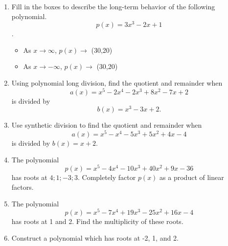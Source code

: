 \documentclass{article}
\begin{document}
\ActivityTitle[class={College Algebra}, number={3}, name={Polynomials 1}]

\begin{enumerate}
\item Fill in the boxes to describe the long-term behavior of the following polynomial. \[ p(x) = 3x^3 - 2x + 1 \].

\begin{itemize}
\item As $x \rightarrow \infty$, $p(x) \rightarrow$ \framebox(30,20){} \vspace{0.5cm}
\item As $x \rightarrow -\infty$, $p(x) \rightarrow$ \framebox(30,20){}
\end{itemize} \vspace{1cm}

\item Using polynomial long division, find the quotient and remainder when \[ a(x) = x^5 - 2x^4 - 2x^3 + 8x^2 - 7x + 2 \] is divided by \[ b(x) = x^3 - 3x + 2. \] \vspace{6cm}

\item Use synthetic division to find the quotient and remainder when \[ a(x) = x^5 - x^4 - 5x^3 + 5x^2 + 4x - 4 \] is divided by $b(x) = x + 2$. \vspace{3cm}

\newpage

\item The polynomial \[ p(x) = x^5 - 4x^4 - 10x^3 + 40x^2 + 9x - 36 \] has roots at ${4;1;-3;3}$. Completely factor $p(x)$ as a product of linear factors. \vspace{7cm}

\item The polynomial \[ p(x) = x^5 - 7x^4 + 19x^3 - 25x^2 + 16x - 4 \] has roots at 1 and 2. Find the multiplicity of these roots. \vspace{7cm}

\item Construct a polynomial which has roots at -2, 1, and 2. \vspace{7cm}
\end{enumerate}
\end{document}
